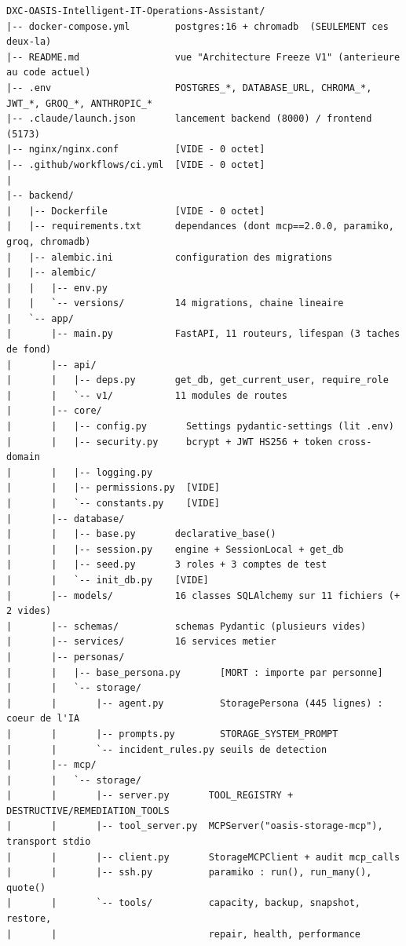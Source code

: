 \documentclass[11pt,a4paper]{report}
\begin{document}
\begin{lstlisting}[caption={Arborescence réelle --- les fichiers vides sont signalés}]
DXC-OASIS-Intelligent-IT-Operations-Assistant/
|-- docker-compose.yml        postgres:16 + chromadb  (SEULEMENT ces deux-la)
|-- README.md                 vue "Architecture Freeze V1" (anterieure au code actuel)
|-- .env                      POSTGRES_*, DATABASE_URL, CHROMA_*, JWT_*, GROQ_*, ANTHROPIC_*
|-- .claude/launch.json       lancement backend (8000) / frontend (5173)
|-- nginx/nginx.conf          [VIDE - 0 octet]
|-- .github/workflows/ci.yml  [VIDE - 0 octet]
|
|-- backend/
|   |-- Dockerfile            [VIDE - 0 octet]
|   |-- requirements.txt      dependances (dont mcp==2.0.0, paramiko, groq, chromadb)
|   |-- alembic.ini           configuration des migrations
|   |-- alembic/
|   |   |-- env.py
|   |   `-- versions/         14 migrations, chaine lineaire
|   `-- app/
|       |-- main.py           FastAPI, 11 routeurs, lifespan (3 taches de fond)
|       |-- api/
|       |   |-- deps.py       get_db, get_current_user, require_role
|       |   `-- v1/           11 modules de routes
|       |-- core/
|       |   |-- config.py       Settings pydantic-settings (lit .env)
|       |   |-- security.py     bcrypt + JWT HS256 + token cross-domain
|       |   |-- logging.py
|       |   |-- permissions.py  [VIDE]
|       |   `-- constants.py    [VIDE]
|       |-- database/
|       |   |-- base.py       declarative_base()
|       |   |-- session.py    engine + SessionLocal + get_db
|       |   |-- seed.py       3 roles + 3 comptes de test
|       |   `-- init_db.py    [VIDE]
|       |-- models/           16 classes SQLAlchemy sur 11 fichiers (+ 2 vides)
|       |-- schemas/          schemas Pydantic (plusieurs vides)
|       |-- services/         16 services metier
|       |-- personas/
|       |   |-- base_persona.py       [MORT : importe par personne]
|       |   `-- storage/
|       |       |-- agent.py          StoragePersona (445 lignes) : coeur de l'IA
|       |       |-- prompts.py        STORAGE_SYSTEM_PROMPT
|       |       `-- incident_rules.py seuils de detection
|       |-- mcp/
|       |   `-- storage/
|       |       |-- server.py       TOOL_REGISTRY + DESTRUCTIVE/REMEDIATION_TOOLS
|       |       |-- tool_server.py  MCPServer("oasis-storage-mcp"), transport stdio
|       |       |-- client.py       StorageMCPClient + audit mcp_calls
|       |       |-- ssh.py          paramiko : run(), run_many(), quote()
|       |       `-- tools/          capacity, backup, snapshot, restore,
|       |                           repair, health, performance

\end{lstlisting}
\end{document}
